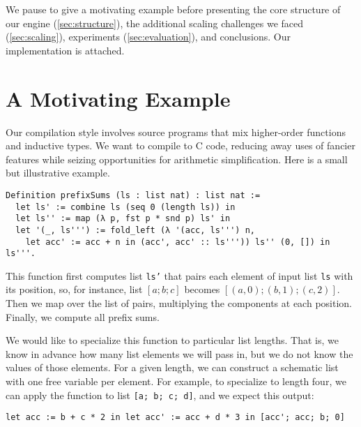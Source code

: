 \documentclass[a4paper,USenglish,cleveref,autoref,thm-restate]{lipics-v2021}
\newcommand{\todo}[1]{\textcolor{red}{\textbf{TODO: #1}}}
\begin{document}
We pause to give a motivating example before presenting the core structure of our engine (\autoref{sec:structure}), the additional scaling challenges we faced (\autoref{sec:scaling}), experiments (\autoref{sec:evaluation}), and conclusions.
Our implementation is attached.

\section{A Motivating Example}\label{sec:motivating-example}\label{sec:explain-ident.eagerly}\label{sec:explain-eval-rect}

Our compilation style involves source programs that mix higher-order functions and inductive types.
We want to compile to C code, reducing away uses of fancier features while seizing opportunities for arithmetic simplification.
Here is a small but illustrative example.

\begin{verbatim}
Definition prefixSums (ls : list nat) : list nat :=
  let ls' := combine ls (seq 0 (length ls)) in
  let ls'' := map (λ p, fst p * snd p) ls' in
  let '(_, ls''') := fold_left (λ '(acc, ls''') n,
    let acc' := acc + n in (acc', acc' :: ls''')) ls'' (0, []) in ls'''.
\end{verbatim}

This function first computes list \texttt{ls'} that pairs each element of input list \texttt{ls} with its position, so, for instance, list $[a; b; c]$ becomes $[(a, 0); (b, 1); (c, 2)]$.
Then we map over the list of pairs, multiplying the components at each position.
Finally, we compute all prefix sums.

We would like to specialize this function to particular list lengths.
That is, we know in advance how many list elements we will pass in, but we do not know the values of those elements.
For a given length, we can construct a schematic list with one free variable per element.
For example, to specialize to length four, we can apply the function to list \texttt{[a; b; c; d]}, and we expect this output:
\begin{verbatim}
let acc := b + c * 2 in let acc' := acc + d * 3 in [acc'; acc; b; 0]
\end{verbatim}
\end{document}
